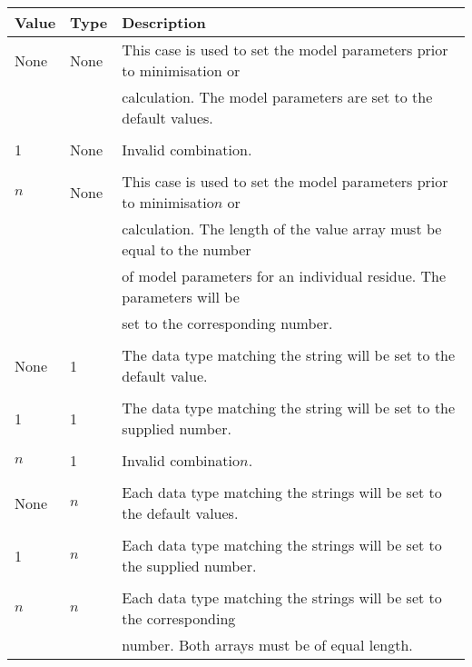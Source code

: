 \begin{center}
\begin{tabular}{lll}
\toprule

Value & Type & Description \\

\midrule

None & None & This case is used to set the model parameters prior to minimisation or \\

 &  & calculation.  The model parameters are set to the default values. \\

 &  &  \\

1 & None & Invalid combination. \\

 &  &  \\

$n$ & None & This case is used to set the model parameters prior to minimisatio$n$ or \\

 &  & calculation.  The length of the value array must be equal to the number \\

 &  & of model parameters for an individual residue.  The parameters will be \\

 &  & set to the corresponding number. \\

 &  &  \\

None & 1 & The data type matching the string will be set to the default value. \\

 &  &  \\

1 & 1 & The data type matching the string will be set to the supplied number. \\

 &  &  \\

$n$ & 1 & Invalid combinatio$n$. \\

 &  &  \\

None & $n$ & Each data type matching the strings will be set to the default values. \\

 &  &  \\

1 & $n$ & Each data type matching the strings will be set to the supplied number. \\

 &  &  \\

$n$ & $n$ & Each data type matching the strings will be set to the corresponding \\

 &  & number.  Both arrays must be of equal length. \\

\bottomrule

\end{tabular}
\end{center}


